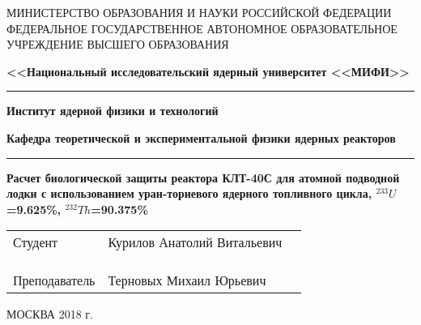 \begin{center}
	\small{МИНИСТЕРСТВО ОБРАЗОВАНИЯ И НАУКИ РОССИЙСКОЙ ФЕДЕРАЦИИ}
	\footnotesize{ФЕДЕРАЛЬНОЕ ГОСУДАРСТВЕННОЕ АВТОНОМНОЕ ОБРАЗОВАТЕЛЬНОЕ УЧРЕЖДЕНИЕ 
		ВЫСШЕГО ОБРАЗОВАНИЯ}
	
	
	\large{\textbf{<<Национальный исследовательский ядерный университет <<МИФИ>>}}
	
	\rule{\textwidth}{.15mm}
	
	\textbf{Институт ядерной физики и технологий}
	
	\textbf{Кафедра теоретической и экспериментальной физики ядерных реакторов}
	
	\rule{\textwidth}{.15mm}
	
	\vspace{1cm}
	
	\textbf{Расчет биологической защиты реактора КЛТ-40С для атомной подводной лодки с использованием уран-ториевого ядерного топливного цикла, $^{233}U$=9.625\%, $^{232}Th$=90.375\%}
	

\end{center}
\vspace{3cm}
\begin{tabularx}{1\textwidth}{p{5cm} l l}
Студент & Курилов Анатолий Витальевич & \underline{\hspace{4cm}} \\
\\
\\
\\
Преподаватель & Терновых Михаил Юрьевич & \underline{\hspace{4cm}}
\end{tabularx}
\vfill

\centering МОСКВА 2018 г.

\pagebreak